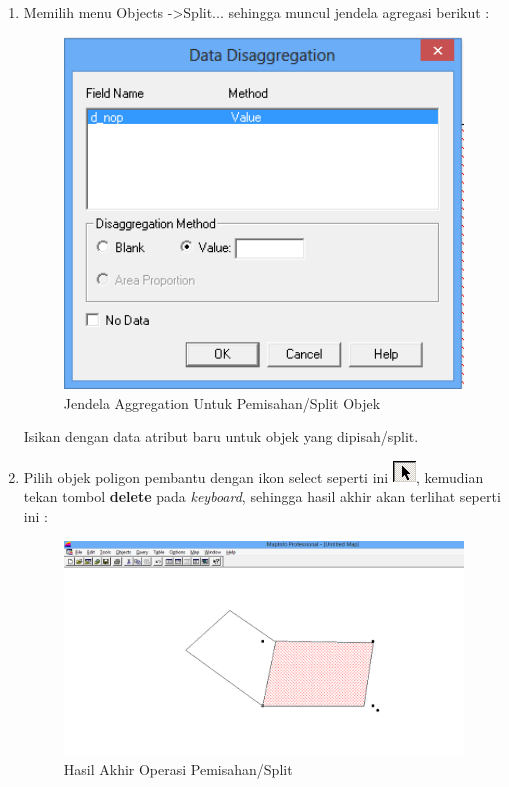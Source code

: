 \begin{enumerate}[\bfseries A.]
\begin{enumerate}[1.]
    \item Memilih menu Objects -\textgreater Split... sehingga muncul jendela agregasi berikut :
    
    \begin{figure}[H]
      \centering
      \includegraphics[width=1\textwidth]{./resources/022-window-aggregation-untuk-split}
      \caption{Jendela Aggregation Untuk Pemisahan/Split Objek}
    \end{figure}
    
    Isikan dengan data atribut baru untuk objek yang dipisah/split.
    
    \item Pilih objek poligon pembantu dengan ikon select seperti ini \includegraphics{./resources/008-ikon-select}, kemudian tekan tombol \textbf{delete} pada \textit{keyboard}, sehingga hasil akhir akan terlihat seperti ini :
    
    \begin{figure}[H]
      \centering
      \includegraphics[width=1\textwidth]{./resources/023-objek-hasil-split}
      \caption{Hasil Akhir Operasi Pemisahan/Split}
    \end{figure}
  \end{enumerate}
  

\end{enumerate}
